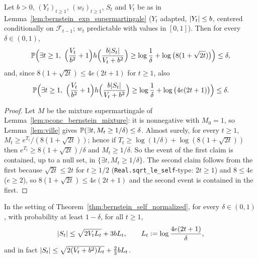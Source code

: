 \begin{theorem}\label{thm:bernstein_self_normalized}
\leanok
Let $b > 0$, $(Y_t)_{t \ge 1}$, $(w_t)_{t \ge 1}$, $S_t$ and $V_t$ be as in
Lemma~\ref{lem:bernstein_exp_supermartingale} ($Y_t$ adapted, $\lvert Y_t \rvert \le b$, centered
conditionally on $\mathcal F_{t-1}$; $w_t$ predictable with values in $[0, 1]$). Then for every
$\delta \in (0, 1)$,
\[
  \Prob\Big( \exists t \ge 1,\ \Big(\frac{V_t}{b^2} + 1\Big) h\Big(\frac{b\abs{S_t}}{V_t + b^2}\Big) \ge \log\frac1\delta + \log\big(8(1 + \sqrt{2t})\big) \Big) \le \delta ,
\]
and, since $8(1 + \sqrt{2t}) \le 4e(2t + 1)$ for $t \ge 1$, also
\[
  \Prob\Big( \exists t \ge 1,\ \Big(\frac{V_t}{b^2} + 1\Big) h\Big(\frac{b\abs{S_t}}{V_t + b^2}\Big) \ge \log\frac1\delta + \log\big(4e(2t + 1)\big) \Big) \le \delta .
\]
\end{theorem}

\begin{proof}
\leanok
Let $M$ be the mixture supermartingale of Lemma~\ref{lem:pconc_bernstein_mixture}: it is
nonnegative with $M_0 = 1$, so Lemma~\ref{lem:ville} gives $\mathbb{P}(\exists t, M_t \ge 1/\delta) \le \delta$.
Almost surely, for every $t \ge 1$, $M_t \ge e^{T_t}/(8(1 + \sqrt{2t}))$; hence if
$T_t \ge \log(1/\delta) + \log(8(1 + \sqrt{2t}))$ then $e^{T_t} \ge 8(1 + \sqrt{2t})/\delta$ and
$M_t \ge 1/\delta$. So the event of the first claim is contained, up to a null set, in
$\{\exists t, M_t \ge 1/\delta\}$. The second claim follows from the first because
$\sqrt{2t} \le 2t$ for $t \ge 1/2$ (\texttt{Real.sqrt\_le\_self}-type: $2t \ge 1$) and
$8 \le 4e$ ($e \ge 2$), so $8(1 + \sqrt{2t}) \le 4e(2t + 1)$ and the second event is contained in
the first.
\end{proof}

\begin{corollary}\label{cor:bernstein_explicit}
\leanok
In the setting of Theorem~\ref{thm:bernstein_self_normalized}, for every $\delta \in (0, 1)$,
with probability at least $1 - \delta$, for all $t \ge 1$,
\[
  \lvert S_t \rvert \le \sqrt{2 V_t L_t} + 3 b L_t, \qquad L_t := \log\frac{4e(2t + 1)}{\delta} ,
\]
and in fact $\lvert S_t \rvert \le \sqrt{2(V_t + b^2) L_t} + \frac23 b L_t$.
\end{corollary}


